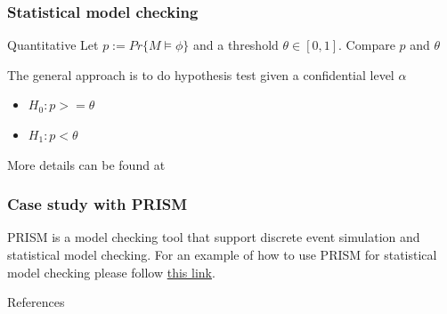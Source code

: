 \documentclass{beamer}
\begin{document}
\begin{frame}
    \frametitle{Statistical model checking}
    \begin{block}{Quantitative}
        Let $p:=Pr\{M \models \phi \}$ and a threshold $\theta \in [0,1]$. Compare $p$ and $\theta$
    \end{block}
    The general approach is to do hypothesis test \cite{younes2005verification} given a confidential level $\alpha$
    \begin{itemize}
        \item $H_0: p >= \theta$
        \item $H_1: p < \theta$
    \end{itemize}
    More details can be found at \cite{wald1945sequential}
\end{frame}

\begin{frame}
    \frametitle{Case study with PRISM}
    PRISM \cite{kwiatkowska2002prism} is a model checking tool that support discrete event simulation and statistical model checking.
    For an example of how to use PRISM for statistical model checking please follow \href{https://www.prismmodelchecker.org/manual/RunningPRISM/StatisticalModelChecking}{this link}.
\end{frame}

\begin{frame}[allowframebreaks]{References}
    \printbibliography
\end{frame}
\end{document}
